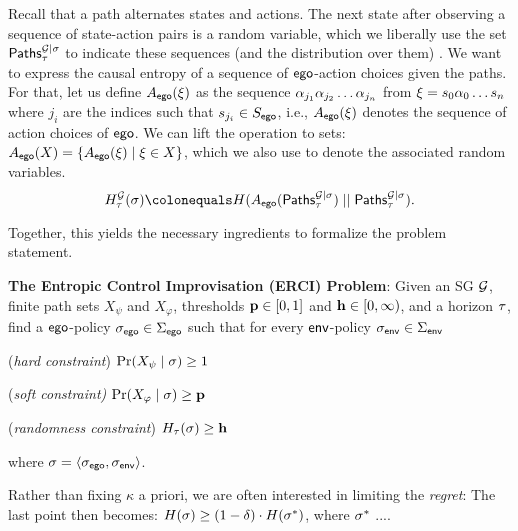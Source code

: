 {{{ Recall that a path alternates states and actions. 
 The next state after observing a sequence of state-action pairs is a random variable, which we liberally use the set $\Paths[\tau]{\sg \mid \sched}$ to indicate these sequences (and the distribution over them) .  We want to express the causal entropy of a sequence of $\pOne$-action choices given the paths. 
 For that, let us define $\Act_\pOne(\path)$ as the sequence $\act_{j_1} \act_{j_2} \hdots \act_{j_n}$ from $\path = s_0\act_0\hdots s_n$ where $j_i$ are the indices such that $s_{j_i} \in S_\pOne$, i.e., 
 $\Act_\pOne(\path)$ denotes the sequence of action choices of $\pOne$. We can lift the operation to sets: $\Act_\pOne(X) = \{ \Act_\pOne(\path) \mid \path \in X \}$, which we also use to denote the associated random variables.
\[ H^\sg_\tau(\sigma) \colonequals H( \Act_\pOne(\Paths[\tau]{\sg \mid \sched})   \mid\mid \Paths[\tau]{\sg \mid \sched} ).  \]


\begin{example}
	
\end{example}

Together, this yields the necessary ingredients to formalize the problem statement. 
\begin{mdframed}[backgroundcolor=blue!5]
\textbf{The Entropic Control Improvisation (ERCI) Problem}:
Given an SG $\sg$, finite path sets $X_\psi$ and $X_\varphi$, thresholds $\scthreshold \in [0,1]$ and $\randomness \in [0,\infty)$, and a horizon $\horizon$,  find a $\pOne$-policy $\pOneSched \in \POneScheds$  such that for every $\pTwo$-policy $\pTwoSched \in \PTwoScheds$ \begin{compactenum}
	\item (\emph{hard constraint}) $\Pr(X_\psi \mid \sched) \geq 1$
	\item (\emph{soft constraint)} $\Pr(X_\varphi \mid \sched) \geq \scthreshold$
\item (\emph{randomness constraint}) $H_\tau(\sigma) \geq \randomness$
\end{compactenum}
where  $\sched = \langle \pOneSched, \pTwoSched \rangle$.
\end{mdframed}
Rather than fixing $\kappa$ a priori, we are often interested in limiting the \emph{regret}: The last point then becomes:
$H(\sched) \geq (1-\delta) \cdot H(\sched^{*})$, where $\sched^{*}$ ....  

}}}
